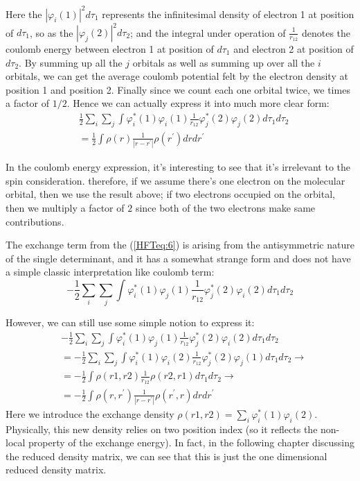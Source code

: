 Here the $|\varphi_{i}(1)|^{2}d\tau_{1}$ represents the
infinitesimal density of electron 1 at position of $d\tau_{1}$, so
as the $|\varphi_{j}(2)|^{2}d\tau_{2}$; and the integral under
operation of $\frac{1}{r_{12}}$ denotes the coulomb energy between
electron 1 at position of $d\tau_{1}$ and electron 2 at position of
$d\tau_{2}$. By summing up all the $j$ orbitals as well as summing
up over all the $i$ orbitals, we can get the average coulomb
potential felt by the electron density at position 1 and position 2. Finally
since we count each one orbital twice, we times a factor of $1/2$. Hence we can
actually express it into much more clear form:
\begin{align}\label{HF_PMTE_eq:1}
&\frac{1}{2}\sum_{i}\sum_{j} \int
\varphi^{*}_{i}(1)\varphi_{i}(1)
\frac{1}{r_{12}}\varphi^{*}_{j}(2)\varphi_{j}(2)
d\tau_{1} d\tau_{2} \nonumber \\
&= \frac{1}{2} \int \rho(r)
\frac{1}{|r-r^{'}|}\rho(r^{'})
d r dr^{'}
\end{align}

In the coulomb energy expression, it's interesting to see that it's
irrelevant to the spin consideration. therefore, if we assume
there's one electron on the molecular orbital, then we use the
result above; if two electrons occupied on the orbital, then we
multiply a factor of $2$ since both of the two electrons make same
contributions.

The exchange term from the (\ref{HFTeq:6}) is arising from the
antisymmetric nature of the single determinant, and it has a
somewhat strange form and does not have a simple classic
interpretation like coulomb term:
\begin{equation}\label{}
-\frac{1}{2}\sum_{i}\sum_{j} \int \varphi^{*}_{i}(1)\varphi_{j}(1)
\frac{1}{r_{12}}\varphi^{*}_{j}(2)\varphi_{i}(2) d\tau_{1} d\tau_{2}
\end{equation}

However, we can still use some simple notion to express it:
\begin{align}\label{HF_PMTE_eq:2}
& -\frac{1}{2}\sum_{i}\sum_{j} \int \varphi^{*}_{i}(1)\varphi_{j}(1)
\frac{1}{r_{12}}\varphi^{*}_{j}(2)\varphi_{i}(2) d\tau_{1} d\tau_{2} \nonumber
\\
& =  -\frac{1}{2}\sum_{i}\sum_{j} \int \varphi^{*}_{i}(1)\varphi_{i}(2)
\frac{1}{r_{12}}\varphi^{*}_{j}(2)\varphi_{j}(1) d\tau_{1}
d\tau_{2} \rightarrow \nonumber \\
&= -\frac{1}{2}\int \rho(r1, r2)\frac{1}{r_{12}}\rho(r2, r1)d\tau_{1}
d\tau_{2} \rightarrow \nonumber \\
&=  -\frac{1}{2}\int \rho(r, r^{'})\frac{1}{|r-r^{'}|}\rho(r^{'}, r)dr
dr^{'}
\end{align}
Here we introduce the exchange density $\rho(r1, r2) =
\sum_{i}\varphi^{*}_{i}(1)\varphi_{i}(2)$. Physically, this new density relies
on two position index (so it reflects the non-local property of the exchange
energy). In fact, in the following chapter discussing the reduced density
matrix, we can see that this is just the one dimensional reduced density matrix.

